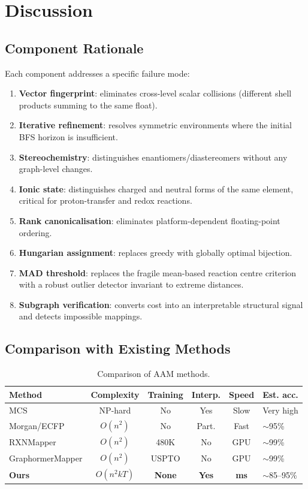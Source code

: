 \documentclass[12pt,a4paper]{article}
\begin{document}
\section{Discussion}

\subsection{Component Rationale}

Each component addresses a specific failure mode:

\begin{enumerate}
  \item \textbf{Vector fingerprint}: eliminates cross-level scalar
    collisions (different shell products summing to the same float).
  \item \textbf{Iterative refinement}: resolves symmetric environments
    where the initial BFS horizon is insufficient.
  \item \textbf{Stereochemistry}: distinguishes enantiomers/diastereomers
    without any graph-level changes.
  \item \textbf{Ionic state}: distinguishes charged and neutral forms
    of the same element, critical for proton-transfer and redox reactions.
  \item \textbf{Rank canonicalisation}: eliminates platform-dependent
    floating-point ordering.
  \item \textbf{Hungarian assignment}: replaces greedy with globally
    optimal bijection.
  \item \textbf{MAD threshold}: replaces the fragile mean-based
    reaction centre criterion with a robust outlier detector invariant
    to extreme distances.
  \item \textbf{Subgraph verification}: converts cost into an
    interpretable structural signal and detects impossible mappings.
\end{enumerate}

\subsection{Comparison with Existing Methods}

\begin{table}[h]
\centering
\caption{Comparison of AAM methods.}
\label{tab:comparison}
\begin{tabular}{lccccl}
\toprule
Method & Complexity & Training & Interp. & Speed & Est. acc. \\
\midrule
MCS              & NP-hard   & No  & Yes & Slow   & Very high \\
Morgan/ECFP      & $O(n^2)$  & No  & Part. & Fast & $\sim$95\% \\
RXNMapper        & $O(n^2)$  & 480K & No & GPU   & $\sim$99\% \\
GraphormerMapper & $O(n^2)$  & USPTO & No & GPU  & $\sim$99\% \\
\textbf{Ours}    & $O(n^2kT)$ & \textbf{None} & \textbf{Yes} & \textbf{ms} & $\sim$85--95\% \\
\bottomrule
\end{tabular}
\end{table}
\end{document}

